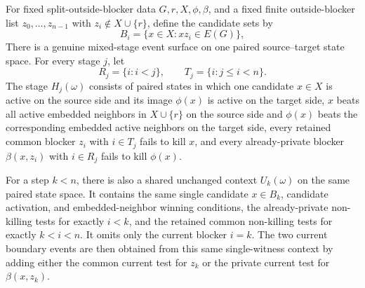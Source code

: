 \begin{helper}
For fixed split-outside-blocker data \(G,r,X,\phi,\beta\), and a fixed finite
outside-blocker list \(z_0,\ldots,z_{n-1}\) with
\(z_i\notin X\cup\{r\}\), define the candidate sets by
\[
  B_i=\{x\in X:xz_i\in E(G)\},
\]
There is a genuine mixed-stage event surface on one paired source--target
state space.  For every stage \(j\), let
\[
  R_j=\{i:i<j\},\qquad T_j=\{i:j\le i<n\}.
\]
The stage \(H_j(\omega)\) consists of paired states in which one candidate
\(x\in X\) is active on the source side and its image \(\phi(x)\) is active
on the target side, \(x\) beats all active embedded neighbors in
\(X\cup\{r\}\) on the source side and \(\phi(x)\) beats the corresponding
embedded active neighbors on the target side, every retained common blocker
\(z_i\) with \(i\in T_j\) fails to kill \(x\), and every already-private
blocker \(\beta(x,z_i)\) with \(i\in R_j\) fails to kill \(\phi(x)\).

For a step \(k<n\), there is also a shared unchanged context
\(U_k(\omega)\) on the same paired state space.  It contains the same
single candidate \(x\in B_k\), candidate activation, and
embedded-neighbor winning conditions, the
already-private non-killing tests for exactly \(i<k\), and the retained
common non-killing tests for exactly \(k<i<n\).  It omits only the current
blocker \(i=k\).  The two current boundary events are then obtained from this
same single-witness context by adding either the common current test for
\(z_k\) or the private current test for \(\beta(x,z_k)\).
\end{helper}
